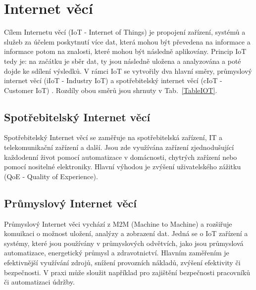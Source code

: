 \chapter{Internet věcí}

Cílem Internetu věcí (IoT - Internet of Things) je propojení zařízení, systémů a služeb za účelem poskytnutí více dat, která mohou být převedena na informace a informace potom na znalosti, které mohou být následně aplikovány. Princip IoT tedy je: na začátku je sběr dat, ty jsou následně uložena a analyzována a poté dojde ke sdílení výsledků. V rámci IoT se vytvořily dva hlavní směry, průmyslový internet věcí (iIoT - Industry IoT) a spotřebitelský internet věcí (cIoT - Customer IoT) \cite{iot_svet_hardware_internet_veci, iot_pohanka_internet_veci}. Rozdíly obou směrů jsou shrnuty v Tab.~\ref{TableIOT}.

\section{Spotřebitelský Internet věcí}
Spotřebitelský Internet věcí se zaměřuje na spotřebitelská zařízení, IT a telekomunikační zařízení a další. Jsou zde využívána zařízení zjednodušující každodenní život pomocí automatizace v domácnosti, chytrých zařízení nebo pomocí nositelné elektroniky. Hlavní výhodou je zvýšení uživatelského zážitku (QoE - Quality of Experience).

\section{Průmyslový Internet věcí}
Průmyslový Internet věci vychází z M2M (Machine to Machine) a rozšiřuje komuikaci o možnost uložení, analýzy a zobrazení dat. Jedná se o IoT zařízení a systémy, které jsou používány v průmyslových odvětvích, jako jsou průmyslová automatizace, energetický průmysl a zdravotnictví. Hlavním zaměřením je efektivnější využívání zdrojů, snížení provozních nákladů, zvýšení efektivity či bezpečnosti. V praxi může sloužit například pro zajištění bezpečnosti pracovníků či automatizaci údržby. 


